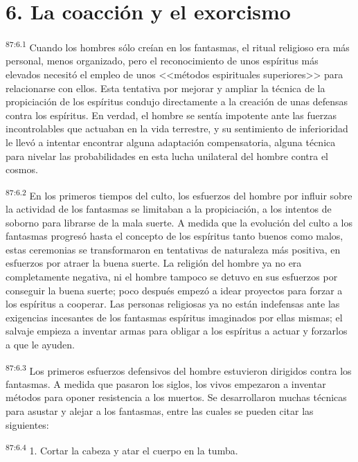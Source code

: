 \documentclass[twoside, 11pt]{book}
\begin{document}
\section*{6. La coacción y el exorcismo}
\par
\textsuperscript{87:6.1} Cuando los hombres sólo creían en los fantasmas, el ritual religioso era más personal, menos organizado, pero el reconocimiento de unos espíritus más elevados necesitó el empleo de unos <<métodos espirituales superiores>> para relacionarse con ellos. Esta tentativa por mejorar y ampliar la técnica de la propiciación de los espíritus condujo directamente a la creación de unas defensas contra los espíritus. En verdad, el hombre se sentía impotente ante las fuerzas incontrolables que actuaban en la vida terrestre, y su sentimiento de inferioridad le llevó a intentar encontrar alguna adaptación compensatoria, alguna técnica para nivelar las probabilidades en esta lucha unilateral del hombre contra el cosmos.

\par
\textsuperscript{87:6.2} En los primeros tiempos del culto, los esfuerzos del hombre por influir sobre la actividad de los fantasmas se limitaban a la propiciación, a los intentos de soborno para librarse de la mala suerte. A medida que la evolución del culto a los fantasmas progresó hasta el concepto de los espíritus tanto buenos como malos, estas ceremonias se transformaron en tentativas de naturaleza más positiva, en esfuerzos por atraer la buena suerte. La religión del hombre ya no era completamente negativa, ni el hombre tampoco se detuvo en sus esfuerzos por conseguir la buena suerte; poco después empezó a idear proyectos para forzar a los espíritus a cooperar. Las personas religiosas ya no están indefensas ante las exigencias incesantes de los fantasmas espíritus imaginados por ellas mismas; el salvaje empieza a inventar armas para obligar a los espíritus a actuar y forzarlos a que le ayuden.

\par
\textsuperscript{87:6.3} Los primeros esfuerzos defensivos del hombre estuvieron dirigidos contra los fantasmas. A medida que pasaron los siglos, los vivos empezaron a inventar métodos para oponer resistencia a los muertos. Se desarrollaron muchas técnicas para asustar y alejar a los fantasmas, entre las cuales se pueden citar las siguientes:

\par
\textsuperscript{87:6.4} 1. Cortar la cabeza y atar el cuerpo en la tumba.
\end{document}
